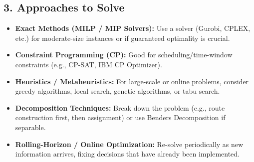 \subsection*{3. Approaches to Solve}

\begin{itemize}
  \item \textbf{Exact Methods (MILP / MIP Solvers):} Use a solver (Gurobi, CPLEX, etc.) for moderate-size instances or if guaranteed optimality is crucial.
  \item \textbf{Constraint Programming (CP):} Good for scheduling/time-window constraints (e.g., CP-SAT, IBM CP Optimizer).
  \item \textbf{Heuristics / Metaheuristics:} For large-scale or online problems, consider greedy algorithms, local search, genetic algorithms, or tabu search.
  \item \textbf{Decomposition Techniques:} Break down the problem (e.g., route construction first, then assignment) or use Benders Decomposition if separable.
  \item \textbf{Rolling-Horizon / Online Optimization:} Re-solve periodically as new information arrives, fixing decisions that have already been implemented.
\end{itemize}